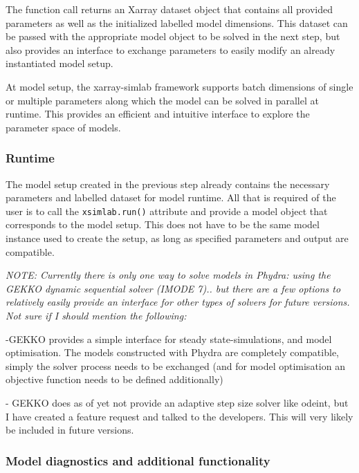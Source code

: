 \documentclass[journal abbreviation, manuscript]{copernicus}
\begin{document}
The function call returns an Xarray dataset object that contains all provided parameters as well as the initialized labelled model dimensions. This dataset can be passed with the appropriate model object to be solved in the next step, but also provides an interface to exchange parameters to easily modify an already instantiated model setup.

At model setup, the xarray-simlab framework supports batch dimensions of single or multiple parameters along which the model can be solved in parallel at runtime. This provides an efficient and intuitive interface to explore the parameter space of models.

\subsubsection{Runtime}
The model setup created in the previous step already contains the necessary parameters and labelled dataset for model runtime. All that is required of the user is to call the \texttt{xsimlab.run()} attribute and provide a model object that corresponds to the model setup. This does not have to be the same model instance used to create the setup, as long as specified parameters and output are compatible.

\textit{NOTE: Currently there is only one way to solve models in Phydra: using the GEKKO dynamic sequential solver (IMODE 7).. but there are a few options to relatively easily provide an interface for other types of solvers for future versions. Not sure if I should mention the following:}

-GEKKO provides a simple interface for steady state-simulations, and model optimisation. The models constructed with Phydra are completely compatible, simply the solver process needs to be exchanged (and for model optimisation an objective function needs to be defined additionally)

- GEKKO does as of yet not provide an adaptive step size solver like odeint, but I have created a feature request and talked to the developers. This will very likely be included in future versions.

\subsubsection{Model diagnostics and additional functionality}
\end{document}

